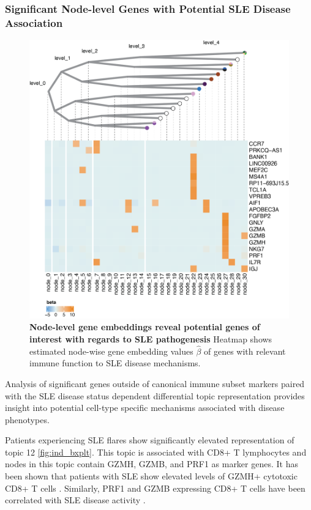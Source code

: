 \subsubsection{Significant Node-level Genes with Potential SLE Disease Association}
\label{cha:genes}
\begin{figure}
    \centering
    \includegraphics[width=\textwidth]{Figures/immune_genes.png}
    \caption{\textbf{Node-level gene embeddings reveal potential genes of interest with regards to SLE pathogenesis} Heatmap shows estimated node-wise gene embedding values $\hat{\beta}$ of genes with relevant immune function to SLE disease mechanisms.}
    \label{fig:immune_genes}
\end{figure}

Analysis of significant genes outside of canonical immune subset markers paired with the SLE disease status dependent differential topic representation provides insight into potential cell-type specific mechanisms associated with disease phenotypes. 

Patients experiencing SLE flares show significantly elevated representation of topic 12 \ref{fig:ind_bxplt}. This topic is associated with CD8+ T lymphocytes and nodes in this topic contain GZMH, GZMB, and PRF1 as marker genes. It has been shown that patients with SLE show elevated levels of GZMH+ cytotoxic CD8+ T cells \cite{sledata}. Similarly, PRF1 and GZMB expressing CD8+ T cells have been correlated with SLE disease activity \cite{blanco2005increase}. 

